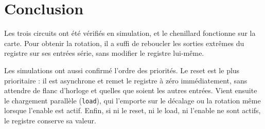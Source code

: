 \section{Conclusion}

Les trois circuits ont été vérifiés en simulation, et le chenillard fonctionne sur la carte. Pour obtenir la rotation, il a suffi de reboucler les sorties extrêmes du registre sur ses entrées série, sans modifier le registre lui-même.

Les simulations ont aussi confirmé l'ordre des priorités. Le reset est le plus prioritaire : il est asynchrone et remet le registre à zéro immédiatement, sans attendre de flanc d'horloge et quelles que soient les autres entrées. Vient ensuite le chargement parallèle (\texttt{load}), qui l'emporte sur le décalage ou la rotation même lorsque l'enable est actif. Enfin, si ni le reset, ni le load, ni l'enable ne sont actifs, le registre conserve sa valeur.

\vspace{3\baselineskip}